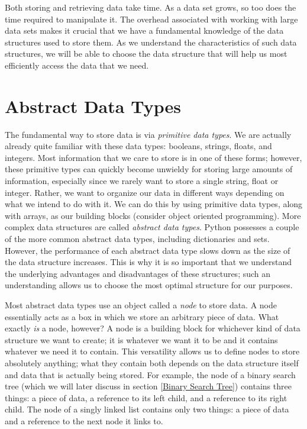 \label{lab:Python_DataStructures}

Both storing and retrieving data take time. As a data set grows, so too does the time required to manipulate it. 
The overhead associated with working with large data sets makes it crucial that we have a fundamental knowledge of the data structures used to store them.
As we understand the characteristics of such data structures, we will be able to choose the data structure that will help us most efficiently access the data that we need.

\section*{Abstract Data Types}
The fundamental way to store data is via \emph{primitive data types}.
We are actually already quite familiar with these data types: booleans, strings, floats, and integers.
Most information that we care to store is in one of these forms; however, these primitive types can quickly become unwieldy for storing large amounts of information, especially since we rarely want to store a single string, float or integer. Rather, we want to organize our data in different ways depending on what we intend to do with it.
We can do this by using primitive data types, along with arrays, as our building blocks (consider object oriented programming).
More complex data structures are called \emph{abstract data types}.
Python possesses a couple of the more common abstract data types, including dictionaries and sets.
However, the performance of each abstract data type slows down as the size of the data structure increases.
This is why it is so important that we understand the underlying advantages and disadvantages of these structures; such an understanding allows us to choose the most optimal structure for our purposes.

Most abstract data types use an object called a \emph{node} to store data.
A node essentially acts as a box in which we store an arbitrary piece of data.
What exactly \emph{is} a node, however?
A node is a building block for whichever kind of data structure we want to create; it is whatever we want it to be and it contains whatever we need it to contain.
This versatility allows us to define nodes to store absolutely anything; what they contain both depends on the data structure itself and data that is actually being stored.
For example, the node of a binary search tree (which we will later discuss in section \ref{Binary Search Tree}) contains three things: a piece of data, a reference to its left child, and a reference to its right child.
The node of a singly linked list contains only two things: a piece of data and a reference to the next node it links to.

